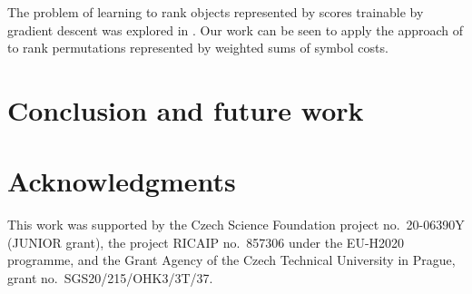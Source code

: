 \documentclass[runningheads]{llncs}
\begin{document}
The problem of learning to rank objects represented by scores trainable by gradient descent was explored in \cite{Burges2005}.
Our work can be seen to apply the approach of \cite{Burges2005} to rank permutations represented by weighted sums of symbol costs.


\section{Conclusion and future work}
\label{sec:conclusion}


\section*{Acknowledgments}


This work was supported by
the Czech Science Foundation project no.~20-06390Y (JUNIOR grant),
the project RICAIP no.~857306 under the EU-H2020 programme,
and
the Grant Agency of the Czech Technical University in Prague, grant
no.~SGS20/215/OHK3/3T/37.





%
\end{document}
